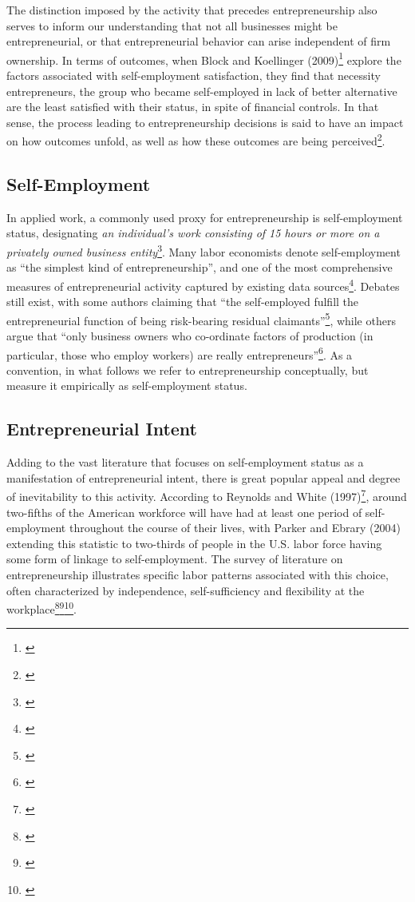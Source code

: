 The distinction imposed by the activity that precedes entrepreneurship also serves to inform our understanding that not all businesses might be entrepreneurial, or that entrepreneurial behavior can arise independent of firm ownership. In terms of outcomes, when Block and Koellinger (2009)\footnote{\cite{BlockKoellinger2009}} explore the factors associated with self-employment satisfaction, they find that necessity entrepreneurs, the group who became self-employed in lack of better alternative are the least satisfied with their status, in spite of financial controls. In that sense, the process leading to entrepreneurship decisions is said to have an impact on how outcomes unfold, as well as how these outcomes are being perceived\footnote{\cite{BlockKoellinger2009}}.

\subsection{Self-Employment}

In applied work, a commonly used proxy for entrepreneurship is self-employment status, designating \textit{an individual's work consisting of 15 hours or more on a privately owned business entity}\footnote{\cite{BlanchflowerOswald1998}}. Many labor economists denote self-employment as ``the simplest kind of entrepreneurship'', and one of the most comprehensive measures of entrepreneurial activity captured by existing data sources\footnote{\cite{Parker2004}}. Debates still exist, with some authors claiming that ``the self-employed fulfill the entrepreneurial function of being risk-bearing residual claimants''\footnote{\cite[Page 5]{Parker2004}}, while others argue that ``only business owners who co-ordinate factors of production (in particular, those who employ workers) are really entrepreneurs''\footnote{\cite[Page 5]{Parker2004}}. As a convention, in what follows we refer to entrepreneurship conceptually, but measure it empirically as self-employment status.

\subsection{Entrepreneurial Intent}

Adding to the vast literature that focuses on self-employment status as a manifestation of entrepreneurial intent, there is great popular appeal and degree of inevitability to this activity. According to Reynolds and White (1997)\footnote{\cite{ReynoldsWhite1997}}, around two-fifths of the American workforce will have had at least one period of self-employment throughout the course of their lives, with Parker and Ebrary (2004) extending this statistic to two-thirds of people in the U.S. labor force having some form of linkage to self-employment. The survey of literature on entrepreneurship illustrates specific labor patterns associated with this choice, often characterized by independence, self-sufficiency and flexibility at the workplace\footnote{\cite{RodrguezFierroGarridoNavarro2015}}\hspace{.15em}\footnote{\cite{Parker2004}}\hspace{.15em}\footnote{\cite{Quinn1980}}. 

